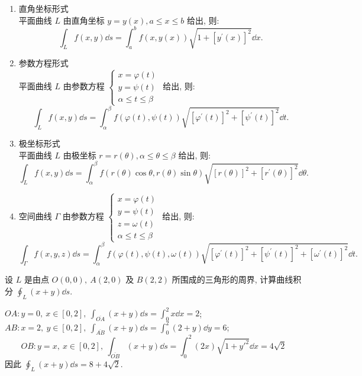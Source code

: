 \begin{theorem}[第一类曲线积分化为定积分]
    \begin{enumerate}[label=(\arabic{*})]
        \item 直角坐标形式\\
              平面曲线 $ L $ 由直角坐标 $ y=y(x), a \leqslant x \leqslant b $ 给出, 则:
              $$\int_{L} f(x, y) \dd  s=\int_{a}^{b} f(x, y(x)) \sqrt{1+\left[y^{\prime}(x)\right]^{2}} \dd  x .$$
        \item 参数方程形式\\
              平面曲线 $ L $ 由参数方程 $ \begin{cases}
                      x=\varphi(t) \\ y=\psi(t)\\\alpha \leqslant t \leqslant \beta
                  \end{cases} $ 给出, 则:
              $$\int_{L} f(x, y) \dd  s=\int_{\alpha}^{\beta} f(\varphi(t), \psi(t)) \sqrt{\left[\varphi^{\prime}(t)\right]^{2}+\left[\psi^{\prime}(t)\right]^{2}} \dd  t .$$
        \item 极坐标形式\\
              平面曲线 $ L $ 由极坐标 $ r=r(\theta), \alpha \leqslant \theta \leqslant \beta $ 给出, 则:
              $$\int_{L} f(x, y) \dd  s=\int_{\alpha}^{\beta} f(r(\theta) \cos \theta, r(\theta) \sin \theta) \sqrt{[r(\theta)]^{2}+\left[r^{\prime}(\theta)\right]^{2}} \dd  \theta .$$
        \item 空间曲线 $\Gamma $ 由参数方程 $\begin{cases}
                      x=\varphi(t) \\ y=\psi(t)\\ z=\omega(t)\\\alpha \leqslant t \leqslant \beta
                  \end{cases}$ 给出, 则:
              $$\int_{\Gamma} f(x, y, z) \dd  s =\int_{\alpha}^{\beta} f(\varphi(t), \psi(t), \omega(t))\sqrt{\left[\varphi^{\prime}(t)\right]^{2}+\left[\psi^{\prime}(t)\right]^{2}+\left[\omega^{\prime}(t)\right]^{2}} \dd  t .$$
    \end{enumerate}
\end{theorem}

\begin{example}
    设 $L$ 是由点 $O(0,0),~A(2,0)$ 及 $B(2,2)$ 所围成的三角形的周界, 计算曲线积分 $\displaystyle\oint_L(x+y)\dd s.$
\end{example}
\begin{solution}
    $OA: y=0,~x\in[0,2],~\displaystyle\int_{\overline{OA}}(x+y)\dd s=\int_{0}^{2}x\dd x=2$; $\displaystyle AB: x=2,~y\in[0,2],~\int_{\overline{AB}}(x+y)\dd s=\int_{0}^{2}(2+y)\dd y=6$;
    $$OB: y=x,~x\in[0,2],~\int_{\overline{OB}}(x+y)\dd s=\int_{0}^{2}(2x)\sqrt{1+y'^2}\dd x=4\sqrt{2}$$
    因此 $\displaystyle\oint_L (x+y)\dd s=8+4\sqrt{2}.$
\end{solution}

